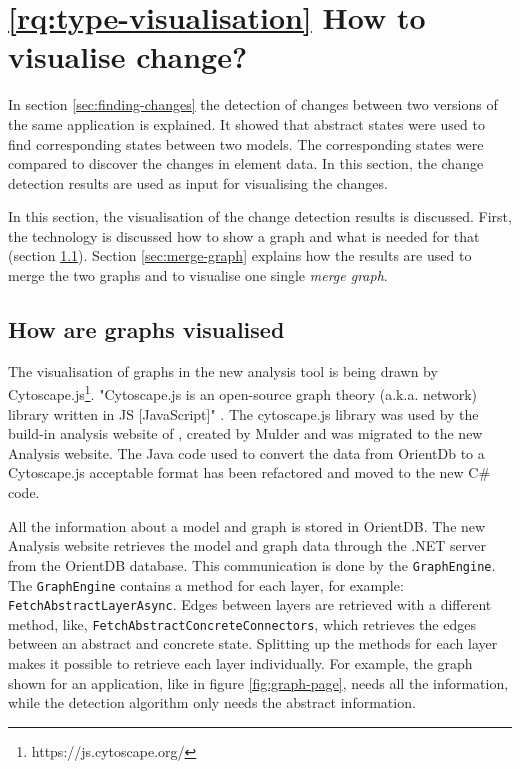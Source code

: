 \section{\ref{rq:type-visualisation} How to visualise change?} \label{rq:type-visualisation-answer}

In section \ref{sec:finding-changes} the detection of changes between two versions of the same application is explained. It showed that abstract states were used to find corresponding states between two models. The corresponding states were compared to discover the changes in element data. In this section, the change detection results are used as input for visualising the changes. 

In this section, the visualisation of the change detection results is discussed. First, the technology is discussed how to show a graph and what is needed for that (section \ref{sec:graph-visualisation}). Section \ref{sec:merge-graph} explains how the results are used to merge the two graphs and to visualise one single \textit{merge graph}.

\subsection{How are graphs visualised} \label{sec:graph-visualisation}

The visualisation of graphs in the new analysis tool is being drawn by Cytoscape.js\footnote{https://js.cytoscape.org/}. "Cytoscape.js is an open-source graph theory (a.k.a. network) library written in JS [JavaScript]" \cite{cytoscape-js}. The cytoscape.js library was used by the build-in analysis website of \testar, created by Mulder \cite{thesisMulders} and was migrated to the new Analysis website. The Java code used to convert the data from OrientDb to a Cytoscape.js acceptable format has been refactored and moved to the new C\# code.

All the information about a model and graph is stored in OrientDB. The new Analysis website retrieves the model and graph data through the \testar .NET server from the OrientDB database. This communication is done by the \verb|GraphEngine|. The \verb|GraphEngine| contains a method for each \testar layer, for example: \verb|FetchAbstractLayerAsync|. Edges between layers are retrieved with a different method, like, \verb|FetchAbstractConcreteConnectors|, which retrieves the edges between an abstract and concrete state. Splitting up the methods for each layer makes it possible to retrieve each layer individually. For example, the graph shown for an application, like in figure \ref{fig:graph-page}, needs all the information, while the detection algorithm only needs the abstract information. 

